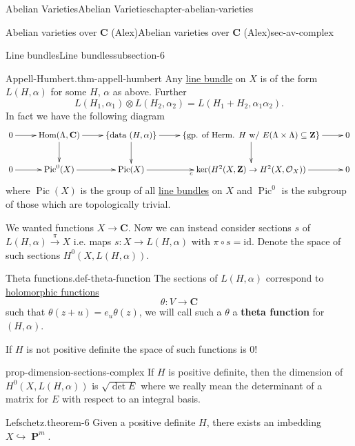 \documentclass[oneside,10pt,]{book}
\newcommand{\terminology}[1]{\textbf{#1}}
\numberwithin{equation}{section}
\newcommand{\sheaf}[1]{\operatorname{\mathcal{#1}}}
\newcommand{\ZZ}{\mathbf{Z}}
\newcommand{\CC}{\mathbf{C}}
\newcommand{\id}{\mathrm{id}}
\DeclareMathOperator{\Hom}{Hom}
\DeclareMathOperator{\Pic}{Pic}
\DeclareMathOperator{\PP}{\mathbf{P}}
\begin{document}
\begin{chapterptx}{Abelian Varieties}{}{Abelian Varieties}{}{}{chapter-abelian-varieties}
\begin{sectionptx}{Abelian varieties over \(\CC\) (Alex)}{}{Abelian varieties over \(\CC\) (Alex)}{}{}{sec-av-complex}
\begin{subsectionptx}{Line bundles}{}{Line bundles}{}{}{subsection-6}
\begin{theorem}{Appell-Humbert.}{}{thm-appell-humbert}%
\hypertarget{p-60}{}%
Any \hyperref[def-line-bundle]{line bundle} on \(X\) is of the form \(L(H,\alpha)\) for some \(H\), \(\alpha\) as above. Further%
\begin{equation*}
L(H_1, \alpha_1) \otimes L(H_2, \alpha_2)  = L(H_1+ H_2, \alpha_1\alpha_2)\text{.}
\end{equation*}
In fact we have the following diagram%
\begin{equation*}
\xymatrix{
0 \ar[r] &
\Hom(\Lambda, \CC) \ar[r]\ar[d] &
\{\text{data } (H,\alpha)\} \ar[r]\ar[d] &
\{\text{gp. of Herm. } H \text{ w/ }E(\Lambda\times \Lambda) \subseteq \ZZ\} \ar[r]\ar[d] &
0 \\
0 \ar[r] &
\Pic^0(X) \ar[r] &
\Pic(X) \ar[r]_c &
\ker(H^2(X,\ZZ) \to H^2(X,\sheaf O_X)) \ar[r]&
0
}
\end{equation*}
where \(\Pic(X)\) is the group of all \hyperref[def-line-bundle]{line bundles} on \(X\) and \(\Pic^0\) is the subgroup of those which are topologically trivial.%
\end{theorem}
\hypertarget{p-61}{}%
We wanted functions \(X\to \CC\). Now we can instead consider sections \(s\) of \(L(H,\alpha) \xrightarrow{\pi} X\) i.e. maps \(s\colon X\to L(H,\alpha)\) with \(\pi\circ s = \id\). Denote the space of such sections \(H^0(X,L(H,\alpha))\).%
\begin{definition}{Theta functions.}{def-theta-function}%
\hypertarget{p-62}{}%
The sections of \(L(H, \alpha)\)  correspond to \hyperref[def-morph-riem-surf]{holomorphic functions}%
\begin{equation*}
\theta \colon V \to \CC
\end{equation*}
such that \(\theta(z+ u) = e_u \theta(z)\), we will call such a \(\theta\) a \terminology{theta function} for \((H,\alpha)\).%
\end{definition}
\hypertarget{p-63}{}%
If \(H\) is not positive definite the space of such functions is 0!%
\begin{proposition}{}{}{prop-dimension-sections-complex}%
\hypertarget{p-64}{}%
If \(H\) is positive definite, then the dimension of \(H^0(X, L(H,\alpha))\) is \(\sqrt{\det E}\) where we really mean the determinant of a matrix for \(E\) with respect to an integral basis.%
\end{proposition}
\begin{theorem}{Lefschetz.}{}{theorem-6}%
\hypertarget{p-65}{}%
Given a positive definite \(H\), there exists an imbedding \(X \hookrightarrow \PP^m\).%

\end{theorem}
\end{subsectionptx}
\end{sectionptx}
\end{chapterptx}
\end{document}
